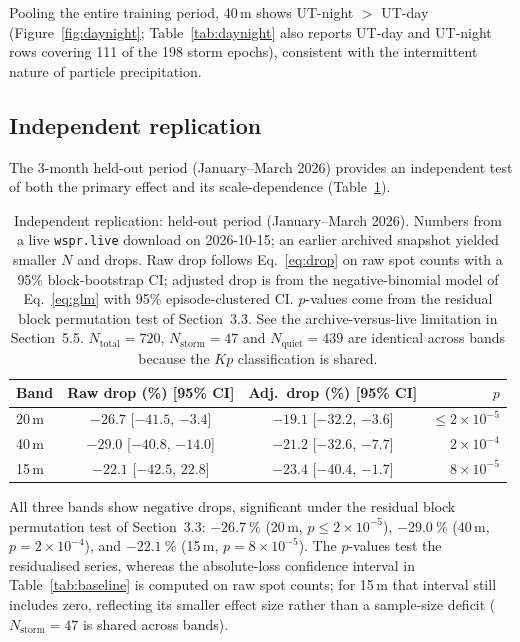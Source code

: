 \documentclass{agujournal2019}
\begin{document}
Pooling the entire training period, 40\,m shows UT-night $>$ UT-day
(Figure~\ref{fig:daynight}; Table~\ref{tab:daynight} also reports UT-day and
UT-night rows covering 111 of the 198 storm epochs), consistent with the
intermittent nature of particle precipitation.

\subsection{Independent replication}

The 3-month held-out period (January--March 2026) provides an independent test
of both the primary effect and its scale-dependence (Table~\ref{tab:heldout}).

\begin{table}[h]
	\centering
	\caption{Independent replication: held-out period (January--March 2026).
		Numbers from a live \texttt{wspr.live} download on 2026-10-15; an
		earlier archived snapshot yielded smaller $N$ and drops. Raw drop
		follows Eq.~\eqref{eq:drop} on raw spot counts with a 95\%
		block-bootstrap CI; adjusted drop is from the negative-binomial
		model of Eq.~\eqref{eq:glm} with 95\% episode-clustered CI.
		$p$-values come from the residual block permutation test of
		Section~3.3. See the archive-versus-live limitation in
		Section~5.5. $N_{\text{total}} = 720$, $N_{\text{storm}} = 47$ and
		$N_{\text{quiet}} = 439$ are identical across bands because the
		$Kp$ classification is shared.}
	\label{tab:heldout}
	\begin{tabular}{lccr}
		\toprule
		Band & Raw drop (\%) [95\% CI] & Adj.\ drop (\%) [95\% CI] & $p$ \\
		\midrule
		20\,m
		& $-26.7$ [$-41.5$, $-3.4$]
		& $-19.1$ [$-32.2$, $-3.6$] & $\le 2 \times 10^{-5}$ \\
		40\,m
		& $-29.0$ [$-40.8$, $-14.0$]
		& $-21.2$ [$-32.6$, $-7.7$] & $2 \times 10^{-4}$ \\
		15\,m
		& $-22.1$ [$-42.5$, $22.8$]
		& $-23.4$ [$-40.4$, $-1.7$] & $8 \times 10^{-5}$ \\
		\bottomrule
	\end{tabular}
\end{table}

All three bands show negative drops, significant under the residual block
permutation test of Section~3.3: $\SI{-26.7}{\percent}$ (20\,m,
$p \le 2 \times 10^{-5}$), $\SI{-29.0}{\percent}$ (40\,m,
$p = 2 \times 10^{-4}$), and $\SI{-22.1}{\percent}$ (15\,m,
$p = 8 \times 10^{-5}$). The $p$-values test the residualised series,
whereas the absolute-loss confidence interval in Table~\ref{tab:baseline}
is computed on raw spot counts; for 15\,m that interval still includes
zero, reflecting its smaller effect size rather than a sample-size deficit
($N_{\text{storm}} = 47$ is shared across bands).
\end{document}
